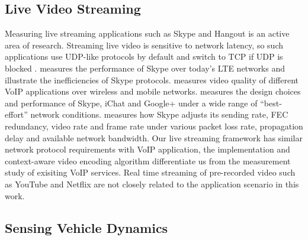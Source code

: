 
\subsection{Live Video Streaming}

Measuring live streaming applications such as Skype and Hangout
is an active area of research. 
Streaming live video is sensitive to network latency,
so such applications use UDP-like protocols by default
and switch to TCP if UDP is 
blocked \cite{yu2014can, xu2012video, zhang2012profiling}.
\cite{li2017measurement} measures the performance of Skype 
over today's LTE networks and illustrate the inefficiencies of Skype protocols.
\cite{yu2014can} measures video quality of different 
VoIP applications over wireless and mobile networks. 
\cite{xu2012video} measures the design choices and 
performance of Skype, iChat and Google+ 
under a wide range of ``best-effort'' network conditions.
\cite{zhang2012profiling} measures how Skype adjusts its sending rate, FEC redundancy,
video rate and frame rate under various packet loss rate, 
propagation delay and available network bandwidth.
Our live streaming framework has similar network protocol
requirements with VoIP application, 
the implementation and context-aware video encoding algorithm
differentiate us from the measurement study of exisiting
VoIP services. 
Real time streaming of pre-recorded video such as YouTube and Netflix \cite{rao2011network}
are not closely related to the application scenario in this work. 


\subsection{Sensing Vehicle Dynamics}

